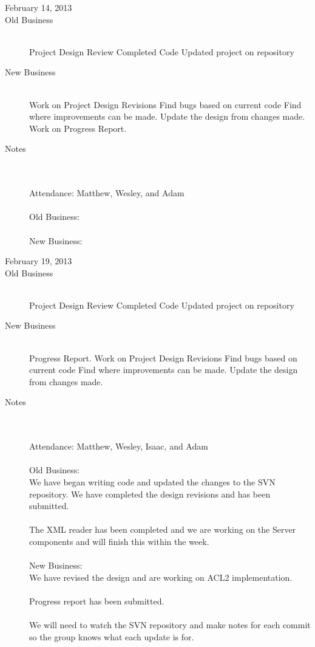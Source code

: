 \documentclass[11pt, letterpaper]{report}
\begin{document}
\begin{description}
\newpage
\item[\Large February 14, 2013]
\hypertarget{February 14, 2013} {}
\item[Old Business] \hfill \\
\subitem Project Design Review
\subitem Completed Code
\subitem Updated project on repository
\item[New Business] \hfill \\
\subitem Work on Project Design Revisions
\subsubitem Find bugs based on current code
\subsubitem Find where improvements can be made.
\subsubitem Update the design from changes made.
\subitem Work on Progress Report.

\item[Notes] \hfill \\ \hfill \\
Attendance:  Matthew, Wesley, and Adam\\ \\
Old Business: 
\\ \\
New Business: 


\newpage
\item[\Large February 19, 2013]
\hypertarget{February 19, 2013} {}
\item[Old Business] \hfill \\
\subitem Project Design Review
\subitem Completed Code
\subitem Updated project on repository
\item[New Business] \hfill \\
\subitem Progress Report.
\subitem Work on Project Design Revisions
\subsubitem Find bugs based on current code
\subsubitem Find where improvements can be made.
\subsubitem Update the design from changes made.


\item[Notes] \hfill \\ \hfill \\
Attendance:  Matthew, Wesley, Isaac, and Adam\\ \\
Old Business: \\
We have began writing code and updated the changes to the SVN repository. We have completed the design revisions and has been submitted. \\ \\
The XML reader has been completed and we are working on the Server components and will finish this within the week.
\\ \\
New Business: \\
We have revised the design and are working on ACL2 implementation. \\ \\
Progress report has been submitted. \\ \\
We will need to watch the SVN repository and make notes for each commit so the group knows what each update is for.






\end{description}
\end{document}
